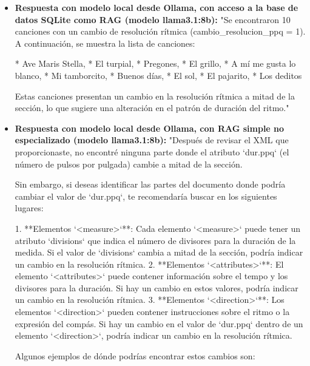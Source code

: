 \begin{itemize}
Ninguno de los fragmentos proporcionados muestra explícitamente un cambio en el valor global de `<divisions>` (en MusicXML) o un atributo equivalente de resolución rítmica de sección (en MEI) a mitad de la pieza. Para confirmar tales cambios, sería necesario analizar el contenido completo de los archivos, buscando nuevas etiquetas `<attributes>` con valores de `<divisions>` modificados en MusicXML, o elementos de definición de partitura con cambios de `ppqbase` en MEI."
    \item \textbf{Respuesta con modelo local desde Ollama, con acceso a la base de datos SQLite como RAG (modelo llama3.1:8b):} "Se encontraron 10 canciones con un cambio de resolución rítmica (cambio\_resolucion\_ppq = 1). A continuación, se muestra la lista de canciones:

* Ave Maris Stella,
* El turpial,
* Pregones,
* El grillo,
* A mí me gusta lo blanco,
* Mi tamborcito,
* Buenos días,
* El sol,
* El pajarito,
* Los deditos

Estas canciones presentan un cambio en la resolución rítmica a mitad de la sección, lo que sugiere una alteración en el patrón de duración del ritmo."
\item \textbf{Respuesta con modelo local desde Ollama, con RAG simple no especializado (modelo llama3.1:8b):} "Después de revisar el XML que proporcionaste, no encontré ninguna parte donde el atributo `dur.ppq` (el número de pulsos por pulgada) cambie a mitad de la sección.

Sin embargo, si deseas identificar las partes del documento donde podría cambiar el valor de `dur.ppq`, te recomendaría buscar en los siguientes lugares:

1. **Elementos `<measure>`**: Cada elemento `<measure>` puede tener un atributo `divisions` que indica el número de divisores para la duración de la medida. Si el valor de `divisions` cambia a mitad de la sección, podría indicar un cambio en la resolución rítmica.
2. **Elementos `<attributes>`**: El elemento `<attributes>` puede contener información sobre el tempo y los divisores para la duración. Si hay un cambio en estos valores, podría indicar un cambio en la resolución rítmica.
3. **Elementos `<direction>`**: Los elementos `<direction>` pueden contener instrucciones sobre el ritmo o la expresión del compás. Si hay un cambio en el valor de `dur.ppq` dentro de un elemento `<direction>`, podría indicar un cambio en la resolución rítmica.

Algunos ejemplos de dónde podrías encontrar estos cambios son:


\end{itemize}

